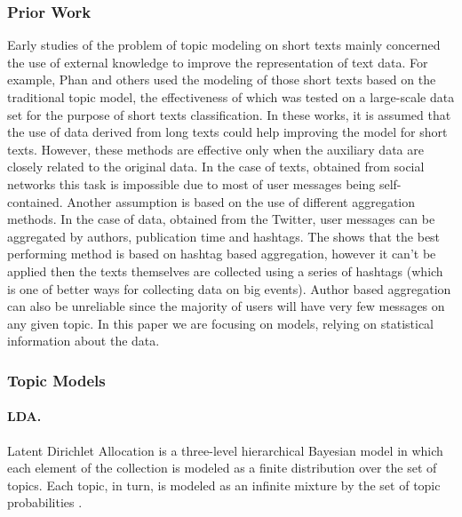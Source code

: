 \subsubsection{Prior Work}

Early studies of the problem of topic modeling on short texts mainly concerned the use of external knowledge to improve the representation of text data. For example, Phan and others \cite{HoriguchiPhanNguyen} used the modeling of those short texts based on the traditional topic model, the effectiveness of which was tested on a large-scale data set for the purpose of short texts classification. In these works, it is assumed that the use of data derived from long texts could help improving the model for short texts. However, these methods are effective only when the auxiliary data are closely related to the original data. In the case of texts, obtained from social networks this task is impossible due to most of user messages being self-contained. Another assumption is based on the use of different aggregation methods. In the case of data, obtained from the Twitter, user messages can be aggregated by authors, publication time and hashtags. The \cite{WrayLexingRishabh} shows that the best performing method is based on hashtag based aggregation, however it can’t be applied then the texts themselves are collected using a series of hashtags (which is one of better ways for collecting data on big events). Author based aggregation can also be unreliable since the majority of users will have very few messages on any given topic. In this paper we are focusing on models, relying on statistical information about the data.

\subsubsection{Topic Models}

\paragraph{LDA.} Latent Dirichlet Allocation is a three-level hierarchical Bayesian model in which each element of the collection is modeled as a finite distribution over the set of topics. Each topic, in turn, is modeled as an infinite mixture by the set of topic probabilities \cite{MichaelJohnDavidAndrew}.

